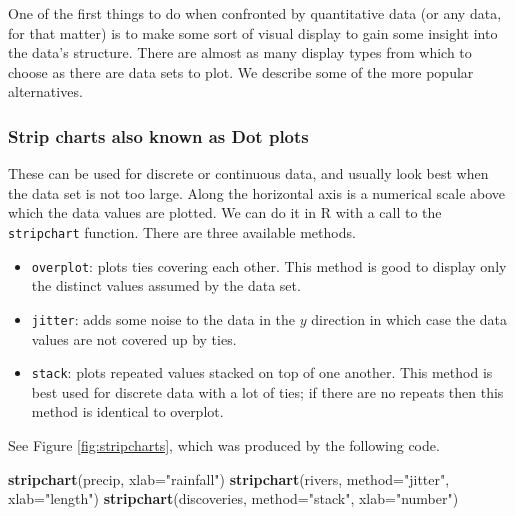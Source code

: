 \documentclass[]{book}
\newenvironment{Shaded}{\begin{snugshade}}{\end{snugshade}}
\newcommand{\KeywordTok}[1]{\textcolor[rgb]{0.13,0.29,0.53}{\textbf{{#1}}}}
\newcommand{\DataTypeTok}[1]{\textcolor[rgb]{0.13,0.29,0.53}{{#1}}}
\newcommand{\StringTok}[1]{\textcolor[rgb]{0.31,0.60,0.02}{{#1}}}
\newcommand{\NormalTok}[1]{{#1}}
\providecommand{\tightlist}{%
  \setlength{\itemsep}{0pt}\setlength{\parskip}{0pt}}
\numberwithin{equation}{chapter}
\numberwithin{figure}{chapter}
\theoremstyle{plain}
\theoremstyle{definition}
\theoremstyle{remark}
\theoremstyle{definition}
\theoremstyle{definition}
\theoremstyle{remark}
\begin{document}
One of the first things to do when confronted by quantitative data (or
any data, for that matter) is to make some sort of visual display to
gain some insight into the data's structure. There are almost as many
display types from which to choose as there are data sets to plot. We
describe some of the more popular alternatives.

\subsubsection{Strip charts also known as Dot
plots}\label{par-strip-charts}

 

These can be used for discrete or continuous data, and usually look best
when the data set is not too large. Along the horizontal axis is a
numerical scale above which the data values are plotted. We can do it in
R with a call to the \texttt{stripchart}
 function. There are three
available methods.

\begin{itemize}
\tightlist
\item
  \texttt{overplot}: plots ties covering each other. This method is good
  to display only the distinct values assumed by the data set.
\item
  \texttt{jitter}: adds some noise to the data in the \(y\) direction in
  which case the data values are not covered up by ties.
\item
  \texttt{stack}: plots repeated values stacked on top of one another.
  This method is best used for discrete data with a lot of ties; if
  there are no repeats then this method is identical to overplot.
\end{itemize}

See Figure \ref{fig:stripcharts}, which was produced by the following
code.

\begin{Shaded}
\begin{Highlighting}[]
\KeywordTok{stripchart}\NormalTok{(precip, }\DataTypeTok{xlab=}\StringTok{"rainfall"}\NormalTok{)}
\KeywordTok{stripchart}\NormalTok{(rivers, }\DataTypeTok{method=}\StringTok{"jitter"}\NormalTok{, }\DataTypeTok{xlab=}\StringTok{"length"}\NormalTok{)}
\KeywordTok{stripchart}\NormalTok{(discoveries, }\DataTypeTok{method=}\StringTok{"stack"}\NormalTok{, }\DataTypeTok{xlab=}\StringTok{"number"}\NormalTok{)}
\end{Highlighting}
\end{Shaded}
\end{document}
